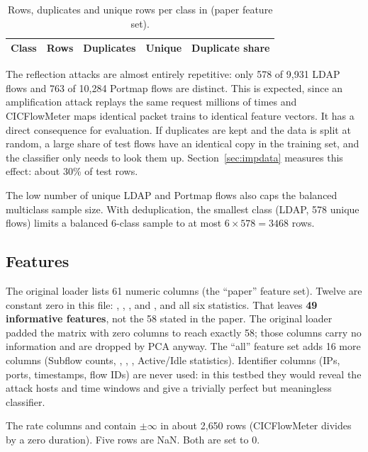 \begin{table}[H]
\centering\small
\caption{Rows, duplicates and unique rows per class in  (paper feature set).}
\label{tab:dups}
\begin{tabular}{lrrrr}
\toprule
Class & Rows & Duplicates & Unique & Duplicate share \\
\midrule

\bottomrule
\end{tabular}
\end{table}

The reflection attacks are almost entirely repetitive: only 578 of 9{,}931 LDAP flows and 763 of
10{,}284 Portmap flows are distinct. This is expected, since an amplification attack replays
the same request millions of times and CICFlowMeter maps identical packet trains to identical
feature vectors. It has a direct consequence for evaluation. If duplicates are kept and the data
is split at random, a large share of test flows have an identical copy in the training set, and
the classifier only needs to look them up. Section~\ref{sec:impdata} measures this effect:
about 30\% of test rows.

The low number of unique LDAP and Portmap flows also caps the balanced multiclass sample size.
With deduplication, the smallest class (LDAP, 578 unique flows) limits a balanced 6-class sample
to at most $6\times578=3468$ rows.

\subsection{Features}
The original loader lists 61 numeric columns (the ``paper'' feature set). Twelve are constant
zero in this file: , , ,  and
, and all six  statistics. That leaves \textbf{49 informative
features}, not the 58 stated in the paper. The original loader padded the matrix with zero
columns to reach exactly 58; those columns carry no information and are dropped by PCA anyway.
The ``all'' feature set adds 16 more columns (Subflow counts, ,
, , Active/Idle statistics). Identifier
columns (IPs, ports, timestamps, flow IDs) are never used: in this testbed they would reveal the
attack hosts and time windows and give a trivially perfect but meaningless classifier.

The rate columns  and  contain $\pm\infty$ in about 2{,}650
rows (CICFlowMeter divides by a zero duration). Five rows are NaN. Both are set to 0.

